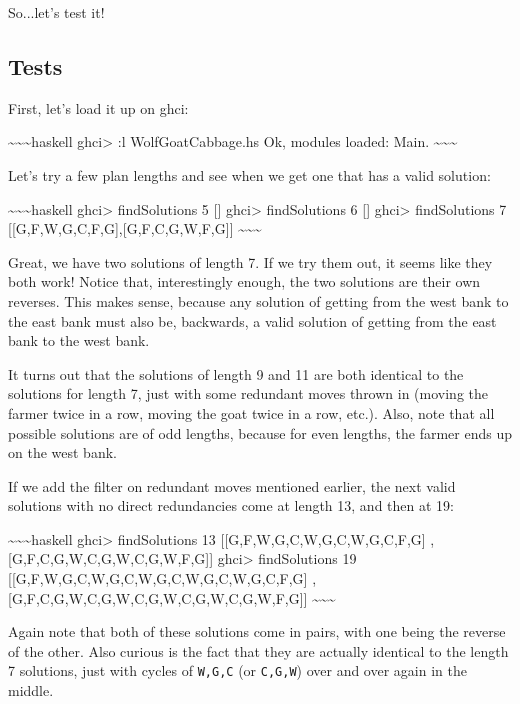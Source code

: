 \documentclass[]{article}
\begin{document}
So...let's test it!

\subsection{Tests}

First, let's load it up on ghci:

\textasciitilde{}\textasciitilde{}\textasciitilde{}haskell ghci\textgreater{} :l
WolfGoatCabbage.hs Ok, modules loaded: Main.
\textasciitilde{}\textasciitilde{}\textasciitilde{}

Let's try a few plan lengths and see when we get one that has a valid solution:

\textasciitilde{}\textasciitilde{}\textasciitilde{}haskell ghci\textgreater{}
findSolutions 5 {[}{]} ghci\textgreater{} findSolutions 6 {[}{]}
ghci\textgreater{} findSolutions 7 {[}{[}G,F,W,G,C,F,G{]},{[}G,F,C,G,W,F,G{]}{]}
\textasciitilde{}\textasciitilde{}\textasciitilde{}

Great, we have two solutions of length 7. If we try them out, it seems like they
both work! Notice that, interestingly enough, the two solutions are their own
reverses. This makes sense, because any solution of getting from the west bank
to the east bank must also be, backwards, a valid solution of getting from the
east bank to the west bank.

It turns out that the solutions of length 9 and 11 are both identical to the
solutions for length 7, just with some redundant moves thrown in (moving the
farmer twice in a row, moving the goat twice in a row, etc.). Also, note that
all possible solutions are of odd lengths, because for even lengths, the farmer
ends up on the west bank.

If we add the filter on redundant moves mentioned earlier, the next valid
solutions with no direct redundancies come at length 13, and then at 19:

\textasciitilde{}\textasciitilde{}\textasciitilde{}haskell ghci\textgreater{}
findSolutions 13 {[}{[}G,F,W,G,C,W,G,C,W,G,C,F,G{]}
,{[}G,F,C,G,W,C,G,W,C,G,W,F,G{]}{]} ghci\textgreater{} findSolutions 19
{[}{[}G,F,W,G,C,W,G,C,W,G,C,W,G,C,W,G,C,F,G{]}
,{[}G,F,C,G,W,C,G,W,C,G,W,C,G,W,C,G,W,F,G{]}{]}
\textasciitilde{}\textasciitilde{}\textasciitilde{}

Again note that both of these solutions come in pairs, with one being the
reverse of the other. Also curious is the fact that they are actually identical
to the length 7 solutions, just with cycles of \texttt{W,G,C} (or
\texttt{C,G,W}) over and over again in the middle.
\end{document}
